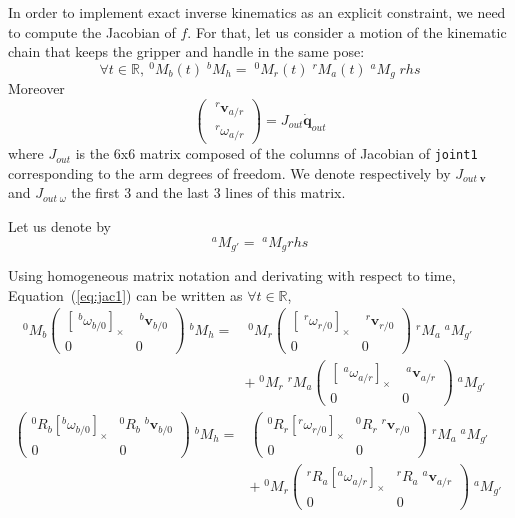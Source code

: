\documentclass{article}
\newcommand\linvel{\mathbf{v}}
\newcommand\conf{\mathbf{q}}
\newcommand\reals{\mathbb{R}}
\begin{document}
In order to implement exact inverse kinematics as an explicit constraint, we need to compute the Jacobian of $f$. For that, let us consider a motion of the kinematic chain that keeps the gripper and handle in the same pose:
\begin{equation}\label{eq:jac1}
\forall t\in\reals,\ ^0M_b(t)\;^bM_h = \;^0M_r(t) \;^rM_a(t)\;^aM_g\;rhs
\end{equation}
Moreover
\begin{equation}\label{eq:jacobian arm}
\left(\begin{array}{c}
  \;^r\linvel_{a/r} \\ \;^r\omega_{a/r}
\end{array}\right) =
J_{out} \dot{\conf}_{out}
\end{equation}
where $J_{out}$ is the 6x6 matrix composed of the columns of Jacobian of \texttt{joint1} corresponding to the arm degrees of freedom. We denote respectively by $J_{out\;\linvel}$ and $J_{out\;\omega}$ the first 3 and the last 3 lines of this matrix.

Let us denote by
$$
^aM_{g'} = \;^aM_g rhs
$$

Using homogeneous matrix notation and derivating with respect to time, Equation~(\ref{eq:jac1}) can be written as $\forall t\in\reals$,
\begin{align}\label{eq:jac2}
  ^0M_b
  \left(\begin{array}{ll}[\;^b\omega_{b/0}]_{\times} & \;^b\linvel_{b/0} \\ 0&0\end{array}\right)\;^bM_h =&
    \;^0M_r\left(\begin{array}{ll}[\;^r\omega_{r/0}]_{\times} & \;^r\linvel_{r/0} \\ 0&0\end{array}\right) \;^rM_a\;^aM_{g'} \\
    & + \;^0M_r \;^rM_a\left(\begin{array}{ll}[\;^a\omega_{a/r}]_{\times} & \;^a\linvel_{a/r} \\ 0&0\end{array}\right)\;^aM_{g'} &
\end{align}
\begin{align*}
  \left(\begin{array}{ll}^0R_b[^b\omega_{b/0}]_{\times} & ^0R_b\;^b\linvel_{b/0} \\ 0&0\end{array}\right)\;^bM_h =&
    \left(\begin{array}{ll}^0R_r[^r\omega_{r/0}]_{\times} & ^0R_r\;^r\linvel_{r/0} \\ 0&0\end{array}\right) \;^rM_a\;^aM_{g'} \\
    & + \;^0M_r \left(\begin{array}{ll}^rR_a[^a\omega_{a/r}]_{\times} & ^rR_a\;^a\linvel_{a/r} \\ 0&0\end{array}\right)\;^aM_{g'} &
\end{align*}
\end{document}
